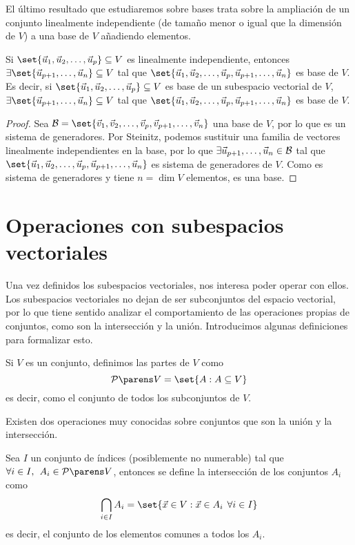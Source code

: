 \documentclass[../algebra_lineal.tex]{subfiles}
\begin{document}
El último resultado que estudiaremos sobre bases trata sobre la ampliación de un conjunto linealmente independiente (de tamaño menor o igual que la dimensión de $V$) a una base de $V$ añadiendo elementos.
\begin{theorem}   
    Si $\set{\vlst{u}{p}} \subseteq V$ es linealmente independiente, entonces  $\exists \set{\vu_{p+1}, \dots, \vu_n} \subseteq V$ tal que $\set{\vlst{u}{p}, \vu_{p+1}, \dots, \vu_n}$ es base de $V$. Es decir, si $\set{\vlst{u}{p}} \subseteq V$ es base de un subespacio vectorial de $V$, $\exists \set{\vu_{p+1}, \dots, \vu_n} \subseteq V$ tal que $\set{\vlst{u}{p}, \vu_{p+1}, \dots, \vu_n}$ es base de $V$.
\end{theorem}
\begin{proof}
    Sea $\mathcal{B} = \set{\vlst{v}{p}, \vv_{p+1}, \dots, \vv_{n}}$ una base de $V$, por lo que es un sistema de generadores. Por Steinitz, podemos sustituir una familia de vectores linealmente independientes en la base, por lo que $\exists \vec{u}_{p+1}, \dots, \vec{u}_n \in \mathcal{B}$ tal que  $\set{\vlst{u}{p}, \vu_{p+1}, \dots, \vu_n}$ es sistema de generadores de $V$. Como es sistema de generadores y tiene $n = \dim{V}$ elementos, es una base.
\end{proof}


\section{Operaciones con subespacios vectoriales}

Una vez definidos los subespacios vectoriales, nos interesa poder operar con ellos. Los subespacios vectoriales no dejan de ser subconjuntos del espacio vectorial, por lo que tiene sentido analizar el comportamiento de las operaciones propias de conjuntos, como son la intersección y la unión. Introducimos algunas definiciones para formalizar esto.

\begin{definition}
    Si $V$ es un conjunto, definimos las partes de $V$ como
    \[
        \partesde{V} = \set{A : A \subseteq V} 
    \] 
    es decir, como el conjunto de todos los subconjuntos de $V$. 
\end{definition}

Existen dos operaciones muy conocidas sobre conjuntos que son la unión y la intersección.

\begin{definition}[Intersección]
    Sea $I$ un conjunto de índices (posiblemente no numerable) tal que $\forall i \in I, \spc A_i \in \partesde{V}$, entonces se define la intersección de los conjuntos $A_i$ como
    \[ \bigcap_{i \in I}A_i = \set{\vx \in V : \vx \in A_i \spc \forall i \in I} \]
    es decir, el conjunto de los elementos comunes a todos los $A_i$.
\end{definition}
\end{document}
